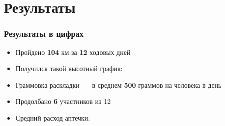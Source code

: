 \section{Результаты}
\begin{frame}
	
	\frametitle[	содержимое...]{Результаты в цифрах}
	\begin{itemize}
		\item<+-> Пройдено \textbf{104} км за \textbf{12} ходовых дней
		\item<+-> Получился такой высотный график:
		\item<+-> Граммовка раскладки~--- в среднем \textbf{500} граммов на человека в день
		\item<+-> Продолбано \textbf{6} участников из 12
		\item<+->Средний расход аптечки:
	\end{itemize}
	
\end{frame}

